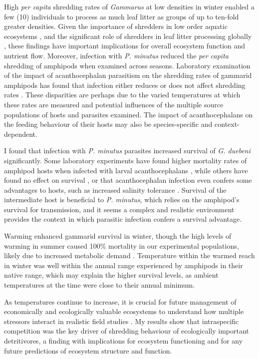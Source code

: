 High \emph{per capita} shredding rates of \emph{Gammarus} at low densities in winter enabled a few (10) individuals to process as much leaf litter as groups of up to ten-fold greater densities. Given the importance of shredders in low order aquatic ecosystems \citep{vannote1980}, and the significant role of shredders in leaf litter processing globally \citep{petersen1974}, these findings have important implications for overall ecosystem function and nutrient flow. Moreover, infection with \emph{P. minutus} reduced the \emph{per capita} shredding of amphipods when examined across seasons. Laboratory examination of the impact of acanthocephalan parasitism on the shredding rates of gammarid amphipods has found that infection either reduces \citep{agatz2014, labaude2016} or does not affect shredding rates \citep[Chapter \ref{chap:physbeh}]{fielding2003}. These disparities are perhaps due to the varied temperatures at which these rates are measured and potential influences of the multiple source populations of hosts and parasites examined. The impact of acanthocephalans on the feeding behaviour of their hosts may also be species-specific and context-dependent. 

I found that infection with \emph{P. minutus} parasites increased survival of \emph{G. duebeni} significantly. Some laboratory experiments have found higher mortality rates of amphipod hosts when infected with larval acanthocephalans \citep{brown1989, labaude2015influence}, while others have found no effect on survival \citep{chen2015}, or that acanthocephalan infection even confers some advantages to hosts, such as increased salinity tolerance \citep{piscart2007}. Survival of the intermediate host is beneficial to \emph{P. minutus}, which relies on the amphipod’s survival for transmission, and it seems a complex and realistic environment provides the context in which parasitic infection confers a survival advantage.  

Warming enhanced gammarid survival in winter, though the high levels of warming in summer caused 100\% mortality in our experimental populations, likely due to increased metabolic demand \citep{galic2017}. Temperature within the warmed reach in winter was well within the annual range experienced by amphipods in their native range, which may explain the higher survival levels, as ambient temperatures at the time were close to their annual minimum. 

As temperatures continue to increase, it is crucial for future management of economically and ecologically valuable ecosystems to understand how multiple stressors interact in realistic field studies \citep{ogorman2014, jackson2016}. My results show that intraspecific competition was the key driver of shredding behaviour of ecologically important detritivores, a finding with implications for ecosystem functioning and for any future predictions of ecosystem structure and function. 
